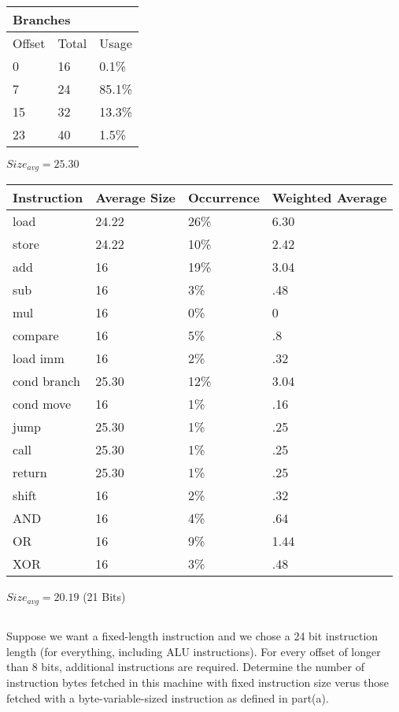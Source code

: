 \documentclass{article}
\begin{document}
\begin{multicols}{3}
\begin{minipage}{\linewidth}
\begin{tabular}{|l|l|l|}
\hline
\multicolumn{3}{|l|}{Branches}\\
\hline
Offset & Total & Usage \\
\hline
0 & 16 & 0.1\%\\
7 & 24 & 85.1\%\\
15 & 32 & 13.3\%\\
23 & 40 & 1.5\%\\
\hline
\end{tabular}\par
\bigskip
$Size_{avg}=25.30$\\
\end{minipage}
\vfill
\columnbreak
\begin{minipage}{\linewidth}
\begin{tabular}{|l|l|l|l|}
\hline
Instruction & Average Size & Occurrence & Weighted Average \\
\hline
load & 24.22 & 26\% &  6.30 \\
store & 24.22 & 10\% & 2.42  \\
add & 16 & 19\% & 3.04 \\
sub & 16 & 3\% & .48 \\
mul & 16 & 0\% & 0 \\
compare & 16 & 5\% & .8\\
load imm & 16 & 2\% & .32\\
cond branch & 25.30 & 12\% & 3.04 \\
cond move & 16 & 1\% & .16\\
jump & 25.30 & 1\% & .25\\ 
call & 25.30 & 1\% & .25\\
return & 25.30 & 1\% & .25\\
shift & 16 & 2\% & .32 \\
AND & 16 & 4\% & .64 \\
OR & 16 & 9\% & 1.44\\
XOR & 16 & 3\% & .48\\
\hline
\end{tabular}\par
\bigskip
$Size_{avg}=20.19$ (21 Bits)\\
\end{minipage}
\end{multicols}
\subsection{}
Suppose we want a fixed-length instruction and we chose a 24 bit instruction length (for everything, including ALU instructions). For every offset of longer than 8 bits, additional instructions are required. Determine the number of instruction bytes fetched in this machine with fixed instruction size verus those fetched with a byte-variable-sized instruction as defined in part(a).\\
\vspace{5mm}
\end{document}
